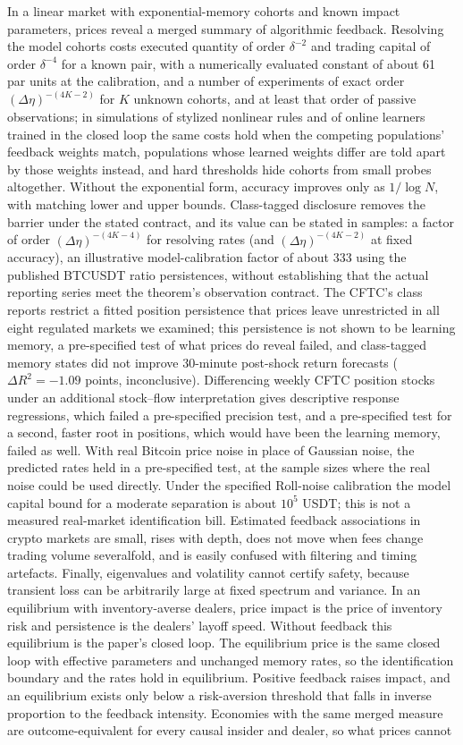In a linear market with exponential-memory cohorts and known impact parameters, prices reveal a merged summary of algorithmic feedback. Resolving the model cohorts costs executed quantity of order $\delta^{-2}$ and trading capital of order $\delta^{-4}$ for a known pair, with a numerically evaluated constant of about 61 par units at the calibration, and a number of experiments of exact order $(\Delta\eta)^{-(4K-2)}$ for $K$ unknown cohorts, and at least that order of passive observations; in simulations of stylized nonlinear rules and of online learners trained in the closed loop the same costs hold when the competing populations' feedback weights match, populations whose learned weights differ are told apart by those weights instead, and hard thresholds hide cohorts from small probes altogether. Without the exponential form, accuracy improves only as $1/\log N$, with matching lower and upper bounds. Class-tagged disclosure removes the barrier under the stated contract, and its value can be stated in samples: a factor of order $(\Delta\eta)^{-(4K-4)}$ for resolving rates (and $(\Delta\eta)^{-(4K-2)}$ at fixed accuracy), an illustrative model-calibration factor of about 333 using the published BTCUSDT ratio persistences, without establishing that the actual reporting series meet the theorem's observation contract. The CFTC's class reports restrict a fitted position persistence that prices leave unrestricted in all eight regulated markets we examined; this persistence is not shown to be learning memory, a pre-specified test of what prices do reveal failed, and class-tagged memory states did not improve 30-minute post-shock return forecasts ($\Delta R^2=-1.09$ points, inconclusive). Differencing weekly CFTC position stocks under an additional stock--flow interpretation gives descriptive response regressions, which failed a pre-specified precision test, and a pre-specified test for a second, faster root in positions, which would have been the learning memory, failed as well. With real Bitcoin price noise in place of Gaussian noise, the predicted rates held in a pre-specified test, at the sample sizes where the real noise could be used directly. Under the specified Roll-noise calibration the model capital bound for a moderate separation is about $10^5$ USDT; this is not a measured real-market identification bill. Estimated feedback associations in crypto markets are small, rises with depth, does not move when fees change trading volume severalfold, and is easily confused with filtering and timing artefacts. Finally, eigenvalues and volatility cannot certify safety, because transient loss can be arbitrarily large at fixed spectrum and variance. In an equilibrium with inventory-averse dealers, price impact is the price of inventory risk and persistence is the dealers' layoff speed. Without feedback this equilibrium is the paper's closed loop. The equilibrium price is the same closed loop with effective parameters and unchanged memory rates, so the identification boundary and the rates hold in equilibrium. Positive feedback raises impact, and an equilibrium exists only below a risk-aversion threshold that falls in inverse proportion to the feedback intensity. Economies with the same merged measure are outcome-equivalent for every causal insider and dealer, so what prices cannot 
